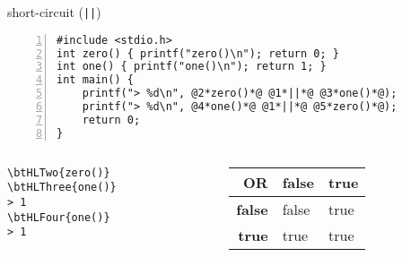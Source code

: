 
\begin{frame}[fragile,label=shortCircuitOr]{short-circuit (\texttt{||})}
\begin{lstlisting}[numbers=left,xleftmargin=1cm,style=small]
#include <stdio.h>
int zero() { printf("zero()\n"); return 0; }
int one() { printf("one()\n"); return 1; }
int main() {
    printf("> %d\n", @2*zero()*@ @1*||*@ @3*one()*@);
    printf("> %d\n", @4*one()*@ @1*||*@ @5*zero()*@);
    return 0;
}
\end{lstlisting}
\begin{columns}[b]
\begin{column}{0.3\textwidth}
\def\btHLTwo{\btHL<2|handout:0>}
\def\btHLThree{\btHL<3|handout:0>}
\def\btHLFour{\btHL<4|handout:0>}
\def\btHLFive{\btHL<5|handout:0>}
\begin{Verbatim}[commandchars=\\\{\}]
\btHLTwo{zero()}
\btHLThree{one()}
> 1
\btHLFour{one()}
> 1
\end{Verbatim} 
\vspace{0pt}
\end{column}
\begin{column}[b]{0.7\textwidth}
\begin{tabular}{r|ll}
OR & \bf { false} & {\bf true} \\ \hline
\bf false & { false} & { true} \\
\bf true & { true} & { true} \\
\end{tabular}
\vspace{1em}
\end{column}
\end{columns}
\end{frame}

